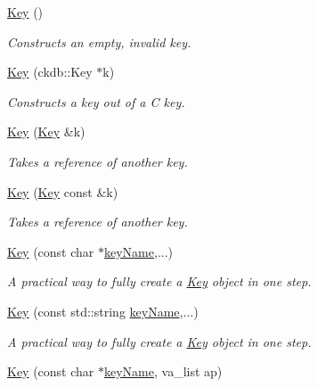 \begin{DoxyCompactItemize}
\item 
\hyperlink{classkdb_1_1Key_a5679f5cae63caddd64a60388b9cc77fa}{Key} ()
\begin{DoxyCompactList}\small\item\em Constructs an empty, invalid key. \end{DoxyCompactList}\item 
\hyperlink{classkdb_1_1Key_a41ada34fa45a270e63444267621b59c9}{Key} (ckdb\+::\+Key $\ast$k)
\begin{DoxyCompactList}\small\item\em Constructs a key out of a C key. \end{DoxyCompactList}\item 
\hyperlink{classkdb_1_1Key_a33f63e153a7d832a54e02c0cba569feb}{Key} (\hyperlink{classkdb_1_1Key}{Key} \&k)
\begin{DoxyCompactList}\small\item\em Takes a reference of another key. \end{DoxyCompactList}\item 
\hyperlink{classkdb_1_1Key_ab68da8be743b2f635ff8e28dfaeaaea6}{Key} (\hyperlink{classkdb_1_1Key}{Key} const \&k)
\begin{DoxyCompactList}\small\item\em Takes a reference of another key. \end{DoxyCompactList}\item 
\hyperlink{classkdb_1_1Key_a15b2e9e1cc323cde05b0d1d3805656e0}{Key} (const char $\ast$\hyperlink{group__keyname_ga8e805c726a60da921d3736cda7813513}{key\+Name},...)
\begin{DoxyCompactList}\small\item\em A practical way to fully create a \hyperlink{classkdb_1_1Key}{Key} object in one step. \end{DoxyCompactList}\item 
\hyperlink{classkdb_1_1Key_acbf7642258d46da2c4427f4104cf01ee}{Key} (const std\+::string \hyperlink{group__keyname_ga8e805c726a60da921d3736cda7813513}{key\+Name},...)
\begin{DoxyCompactList}\small\item\em A practical way to fully create a \hyperlink{classkdb_1_1Key}{Key} object in one step. \end{DoxyCompactList}\item 
\hyperlink{classkdb_1_1Key_aa0dc94c7e676a0d280e5817e4c6238d3}{Key} (const char $\ast$\hyperlink{group__keyname_ga8e805c726a60da921d3736cda7813513}{key\+Name}, va\+\_\+list ap)

\end{DoxyCompactItemize}
